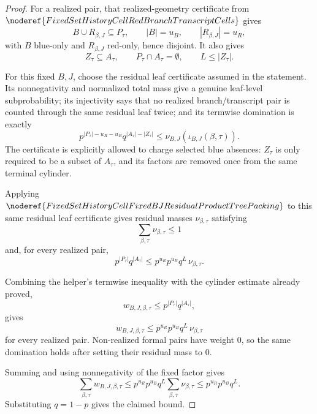 \begin{proof}
For a realized pair, that realized-geometry certificate from
\(\noderef{FixedSetHistoryCellRedBranchTranscriptCells}\) gives
\[
B\cup R_{\beta,J}\subseteq P_\tau,\qquad |B|=u_B,\qquad
|R_{\beta,J}|=u_R,
\]
with \(B\) blue-only and \(R_{\beta,J}\) red-only, hence disjoint.  It also
gives
\[
Z_\tau\subseteq A_\tau,\qquad P_\tau\cap A_\tau=\emptyset,\qquad
L\le |Z_\tau|.
\]

For this fixed \(B,J\), choose the residual leaf certificate assumed in the
statement.  Its nonnegativity and normalized total mass give a genuine
leaf-level subprobability; its injectivity says that no realized
branch/transcript pair is counted through the same residual leaf twice; and
its termwise domination is exactly
\[
p^{|P_\tau|-u_R-u_B}q^{|A_\tau|-|Z_\tau|}
\le \nu_{B,J}(\iota_{B,J}(\beta,\tau)).
\]
The certificate is explicitly allowed to charge selected blue absences:
\(Z_\tau\) is only required to be a subset of \(A_\tau\), and its factors are
removed once from the same terminal cylinder.

Applying
\(\noderef{FixedSetHistoryCellFixedBJResidualProductTreePacking}\) to this
same residual leaf certificate gives residual masses \(\nu_{\beta,\tau}\)
satisfying
\[
\sum_{\beta,\tau}\nu_{\beta,\tau}\le1
\]
and, for every realized pair,
\[
p^{|P_\tau|}q^{|A_\tau|}
\le
p^{u_R}p^{u_B}q^L\,\nu_{\beta,\tau}.
\]

Combining the helper's termwise inequality with the cylinder estimate already
proved,
\[
w_{B,J,\beta,\tau}\le p^{|P_\tau|}q^{|A_\tau|},
\]
gives
\[
w_{B,J,\beta,\tau}
\le p^{u_R}p^{u_B}q^L\,\nu_{\beta,\tau}
\]
for every realized pair.  Non-realized formal pairs have weight \(0\), so the
same domination holds after setting their residual mass to \(0\).

Summing and using nonnegativity of the fixed factor gives
\[
\sum_{\beta,\tau} w_{B,J,\beta,\tau}
\le
p^{u_R}p^{u_B}q^L
  \sum_{\beta,\tau}\nu_{\beta,\tau}
\le
p^{u_R}p^{u_B}q^L .
\]
Substituting \(q=1-p\) gives the claimed bound.
\end{proof}

